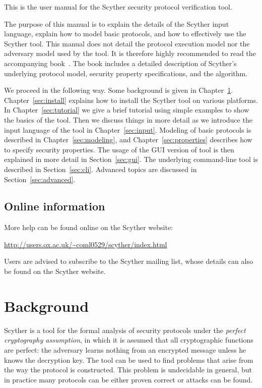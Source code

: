 \documentclass{book}
\begin{document}
\bigskip

\noindent
This is the user manual for the Scyther security protocol verification
tool.

The purpose of this manual is to explain the
details of the Scyther input language, explain how to model basic
protocols, and how to effectively use the Scyther tool.
This manual does not detail the protocol execution model nor
the adversary model used by the tool. It is therefore highly recommended to read the
accompanying book~\cite{opsembook}. The book includes a detailed
description of Scyther's
underlying protocol model, security property specifications, and the
algorithm.

We proceed in the following way. Some background is given in
Chapter~\ref{sec:background}. 
Chapter~\ref{sec:install} explains how to install the Scyther tool on
various platforms. In Chapter~\ref{sec:tutorial} we give a brief
tutorial using simple examples to show the basics of the tool.
Then we discuss things in more detail as we introduce the input language
of the tool in Chapter~\ref{sec:input}. Modeling of basic protocols is
described in Chapter~\ref{sec:modeling}, and
Chapter~\ref{sec:properties} describes how to specify security
properties. The usage of the GUI version of tool
is then explained in more detail in Section~\ref{sec:gui}. The
underlying command-line tool is described in Section~\ref{sec:cli}.
Advanced topics are discussed
in Section~\ref{sec:advanced}.

\section*{Online information}

More help can be found online on the Scyther website:

\medskip
\url{http://users.ox.ac.uk/~coml0529/scyther/index.html}
\medskip

\noindent
Users are advised to subscribe to the Scyther mailing list,
whose details can also be found on the Scyther website.

\chapter{Background}
\label{sec:background}

Scyther is a tool for the formal analysis of security protocols under the
\emph{perfect cryptography assumption}, in which it is assumed that all
cryptographic functions are perfect: the adversary learns nothing from
an encrypted message unless he knows the decryption key. The tool can be
used to find problems that arise from the way the protocol is
constructed. This problem is undecidable in general, but in practice
many protocols can be either proven correct or attacks can be found.
\end{document}

